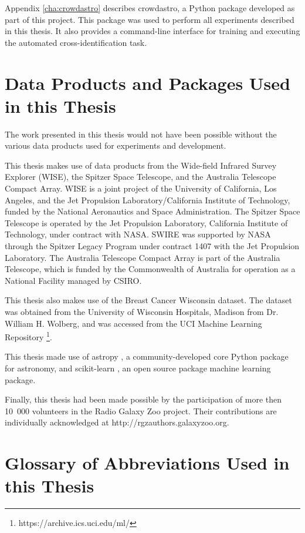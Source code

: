   Appendix \ref{cha:crowdastro} describes crowdastro, a Python package developed
  as part of this project. This package was used to perform all experiments
  described in this thesis. It also provides a command-line interface for
  training and executing the automated cross-identification task.

\section{Data Products and Packages Used in this Thesis}
\label{sec:data-products}
  
  The work presented in this thesis would not have been possible without the
  various data products used for experiments and development.

  This thesis makes use of data products from the Wide-field Infrared Survey
  Explorer (WISE), the Spitzer Space Telescope, and the Australia Telescope
  Compact Array. WISE is a joint project of the University of California, Los
  Angeles, and the Jet Propulsion Laboratory/California Institute of Technology,
  funded by the National Aeronautics and Space Administration. The Spitzer Space
  Telescope is operated by the Jet Propulsion Laboratory, California Institute
  of Technology, under contract with NASA. SWIRE was supported by NASA through
  the Spitzer Legacy Program under contract 1407 with the Jet Propulsion
  Laboratory. The Australia Telescope Compact Array is part of the Australia
  Telescope, which is funded by the Commonwealth of Australia for operation as a
  National Facility managed by CSIRO.

  This thesis also makes use of the Breast Cancer Wisconsin dataset. The dataset
  was obtained from the University of Wisconsin Hospitals, Madison from Dr.
  William H. Wolberg, and was accessed from the UCI Machine Learning Repository
  \footnote{https://archive.ics.uci.edu/ml/}.

  This thesis made use of astropy \citep{astropy}, a community-developed core
  Python package for astronomy, and scikit-learn \citep{scikit-learn}, an open
  source package machine learning package.

  Finally, this thesis had been made possible by the participation of more then
  10~000 volunteers in the Radio Galaxy Zoo project. Their contributions are
  individually acknowledged at http://rgzauthors.galaxyzoo.org.

\section{Glossary of Abbreviations Used in this Thesis}
  
